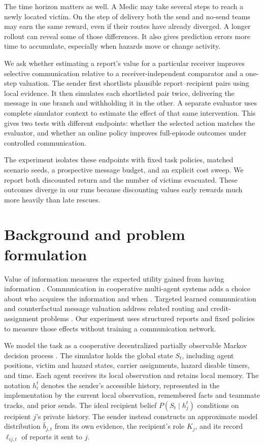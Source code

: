 \documentclass{article}
\begin{document}
The time horizon matters as well. A Medic may take several steps to reach a newly located victim. On the step of delivery both the send and no-send teams may earn the same reward, even if their routes have already diverged. A longer rollout can reveal some of those differences. It also gives prediction errors more time to accumulate, especially when hazards move or change activity.

We ask whether estimating a report's value for a particular receiver improves selective communication relative to a receiver-independent comparator and a one-step valuation. The sender first shortlists plausible report--recipient pairs using local evidence. It then simulates each shortlisted pair twice, delivering the message in one branch and withholding it in the other. A separate evaluator uses complete simulator context to estimate the effect of that same intervention. This gives two tests with different endpoints: whether the selected action matches the evaluator, and whether an online policy improves full-episode outcomes under controlled communication.

The experiment isolates these endpoints with fixed task policies, matched scenario seeds, a prospective message budget, and an explicit cost sweep. We report both discounted return and the number of victims evacuated. These outcomes diverge in our runs because discounting values early rewards much more heavily than late rescues.

\section{Background and problem formulation}

Value of information measures the expected utility gained from having information \cite{howard1966}. Communication in cooperative multi-agent systems adds a choice about who acquires the information and when \cite{xuan2001}. Targeted learned communication and counterfactual message valuation address related routing and credit-assignment problems \cite{das2019,gao2025}. Our experiment uses structured reports and fixed policies to measure those effects without training a communication network.

We model the task as a cooperative decentralized partially observable Markov decision process \cite{oliehoek2016}. The simulator holds the global state $S_t$, including agent positions, victim and hazard states, carrier assignments, hazard disable timers, and time. Each agent receives its local observation and retains local memory. The notation $h_i^t$ denotes the sender's accessible history, represented in the implementation by the current local observation, remembered facts and teammate tracks, and prior sends. The ideal recipient belief $P(S_t\mid h_j^t)$ conditions on recipient $j$'s private history. The sender instead constructs an approximate model distribution $\widehat b_{j,t}$ from its own evidence, the recipient's role $K_j$, and its record $\ell_{ij,t}$ of reports it sent to $j$.
\end{document}
